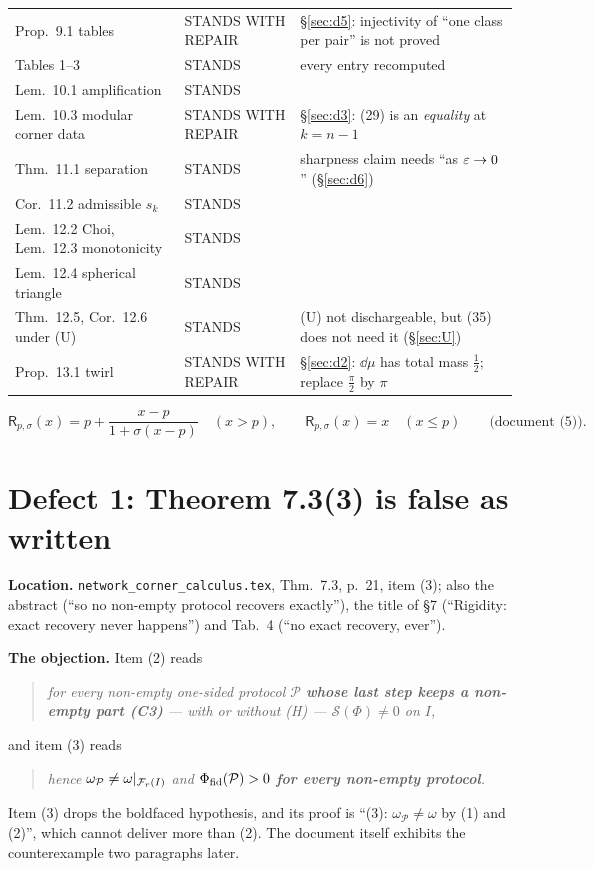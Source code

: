 \documentclass[11pt]{article}
\newcommand{\Sch}{\mathcal S}
\newcommand{\Rp}{\mathsf R}
\newcommand{\Fr}{\cF_r}
\newcommand{\PP}{\mathcal P}
\newcommand{\doc}{\texttt{network\_corner\_calculus.tex}}
\theoremstyle{definition}\newtheorem{example}[theorem]{Example}
\begin{document}
\begin{table}[h]
\begin{tabular}{@{}llp{7.4cm}@{}}
Prop.~9.1 tables & STANDS WITH REPAIR & \S\ref{sec:d5}: injectivity of
 ``one class per pair'' is not proved\\
Tables 1--3 & STANDS & every entry recomputed\\
Lem.~10.1 amplification & STANDS & \\
Lem.~10.3 modular corner data & STANDS WITH REPAIR & \S\ref{sec:d3}: (29) is an
 \emph{equality} at $k=n-1$\\
Thm.~11.1 separation & STANDS & sharpness claim needs ``as $\varepsilon\to0$'' (\S\ref{sec:d6})\\
Cor.~11.2 admissible $s_k$ & STANDS & \\
Lem.~12.2 Choi, Lem.~12.3 monotonicity & STANDS & \\
Lem.~12.4 spherical triangle & STANDS & \\
Thm.~12.5, Cor.~12.6 under (U) & STANDS & (U) not dischargeable, but (35) does not need
 it (\S\ref{sec:U})\\
Prop.~13.1 twirl & STANDS WITH REPAIR & \S\ref{sec:d2}: $\dd\mu$ has total mass
 $\frac12$; replace $\frac\pi2$ by $\pi$\\
\bottomrule
\end{tabular}
\end{table}


\begin{equation}\label{eq:nothing}
 \Rp_{p,\sigma}(x)=p+\frac{x-p}{1+\sigma(x-p)}\quad(x>p),\qquad \Rp_{p,\sigma}(x)=x\quad(x\le p)
 \qquad\text{(document (5))}.
\end{equation}

\section{Defect 1: Theorem 7.3(3) is false as written}\label{sec:d1}

\textbf{Location.}  \doc, Thm.~7.3, p.~21, item (3); also the abstract (``so no non-empty
protocol recovers exactly''), the title of \S7 (``Rigidity: exact recovery never happens'')
and Tab.~4 (``no exact recovery, ever'').

\textbf{The objection.}  Item (2) reads
\begin{quote}\itshape
for \emph{every} non-empty one-sided protocol $\PP$ \textbf{whose last step keeps a
non-empty part (C3)} --- with or without (H) --- $\Sch(\Phi)\ne0$ on $I$,
\end{quote}
and item (3) reads
\begin{quote}\itshape
hence $\omega_\PP\ne\omega|_{\Fr(I)}$ and $\Phi_{\rm fid}(\PP)>0$ \textbf{for every
non-empty protocol}.
\end{quote}
Item (3) drops the boldfaced hypothesis, and its proof is ``(3): $\omega_\PP\ne\omega$ by
(1) and (2)'', which cannot deliver more than (2).  The document itself exhibits the
counterexample two paragraphs later.
\end{document}
